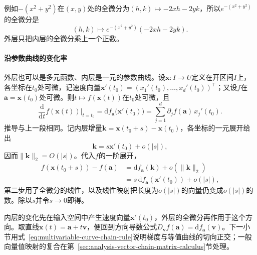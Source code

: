 例如$-(x^2+y^2)$在$(x,y)$处的全微分为$(h,k)\mapsto-2xh-2yk$，所以$e^{-(x^2+y^2)}$的全微分是
\[
 (h,k)\mapsto e^{-(x^2+y^2)}(-2xh-2yk).
\]
外层只把内层的全微分乘上一个正数。

\paragraph{沿参数曲线的变化率}
外层也可以是多元函数、内层是一元的参数曲线。设$\bm x:I\to U$定义在开区间$I$上，各坐标在$t_0$处可微，记速度向量$\bm x'(t_0)=(x_1'(t_0),\ldots,x_d'(t_0))^\top$；又设$f$在$\bm a=\bm x(t_0)$处可微。则$t\mapsto f(\bm x(t))$在$t_0$处可微，且
\begin{equation}
 \frac{\mathrm d}{\mathrm dt}f(\bm x(t))\Big|_{t=t_0}
 =\mathrm df_{\bm a}\bigl(\bm x'(t_0)\bigr)
 =\sum_{j=1}^d\partial_jf(\bm a)\,x_j'(t_0).
\label{eq:multivariable-curve-chain-rule}
\end{equation}
推导与上一段相同。记内层增量$\bm k=\bm x(t_0+s)-\bm x(t_0)$，各坐标的一元展开给出
\[
 \bm k=s\bm x'(t_0)+o(|s|),
\]
因而$\lVert\bm k\rVert_2=O(|s|)$。代入$f$的一阶展开，
\[
 \begin{aligned}
 f(\bm x(t_0+s))-f(\bm a)
 &=\mathrm df_{\bm a}(\bm k)+o(\lVert\bm k\rVert_2)\\
 &=s\,\mathrm df_{\bm a}(\bm x'(t_0))+o(|s|),
 \end{aligned}
\]
第二步用了全微分的线性，以及线性映射把长度为$o(|s|)$的向量仍变成$o(|s|)$的数。除以$s$并令$s\to0$即得。

内层的变化先在输入空间中产生速度向量$\bm x'(t_0)$，外层的全微分再作用于这个方向。取直线$\bm x(t)=\bm a+t\bm v$，便回到方向导数公式$D_{\bm v}f(\bm a)=\mathrm df_{\bm a}(\bm v)$。下一小节用式~\eqref{eq:multivariable-curve-chain-rule}说明梯度与等值曲线的切向正交；一般向量值映射的复合在第~\ref{sec:analysis-vector-chain-matrix-calculus}节处理。

